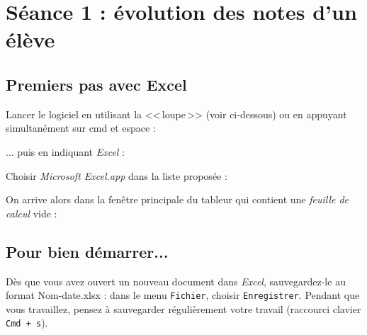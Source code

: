 \newpage


\section{Séance 1 : évolution des notes d'un élève}


\subsection{Premiers pas avec Excel}

Lancer le logiciel en utilisant la <<\,loupe\,>> (voir ci-dessous) ou en appuyant simultanément sur cmd et espace :


... puis en indiquant \emph{Excel} :


Choisir \emph{Microsoft Excel.app} dans la liste proposée :


On arrive alors dans la fenêtre principale du tableur qui contient une \emph{feuille de calcul} vide :




%
%
%
%


\subsection{Pour bien démarrer...}

Dès que vous avez ouvert un nouveau document dans \emph{Excel}, sauvegardez-le au format Nom-date.xlsx : dans le menu \texttt{Fichier}, choisir \texttt{Enregistrer}. Pendant que vous travaillez, pensez à sauvegarder régulièrement votre travail (raccourci clavier \texttt{Cmd + s}).   



